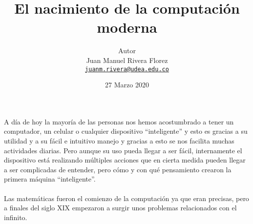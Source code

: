 \documentclass[11pt]{article}
\title{El nacimiento de la computación moderna}
\author{{\Large Autor}\\Juan Manuel Rivera Florez\\
        \href{mailto:juanm.rivera@udea.edu.co}{\texttt{juanm.rivera@udea.edu.co}}}
\date{27 Marzo 2020}
\begin{document}
\maketitle


%
A día de hoy la mayoría de las personas nos hemos acostumbrado a tener un computador, un celular o cualquier dispositivo “inteligente” y esto es gracias a su utilidad y a su fácil e intuitivo manejo y gracias a esto se nos facilita muchas actividades diarias. Pero aunque su uso pueda llegar a ser fácil, internamente el dispositivo está realizando múltiples acciones que en cierta medida pueden llegar a ser complicadas de entender, pero cómo y con qué pensamiento crearon la primera máquina “inteligente”. 
%
\\
\\
%
Las matemáticas fueron el comienzo de la computación ya que eran precisas, pero a finales del siglo XIX empezaron a surgir unos problemas relacionados con el infinito. 
%
\end{document}
